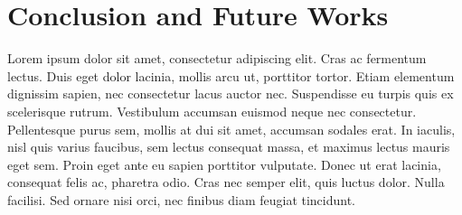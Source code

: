 \section{Conclusion and Future Works}
	Lorem ipsum dolor sit amet, consectetur adipiscing elit. Cras ac fermentum lectus. Duis eget dolor lacinia, mollis arcu ut, porttitor tortor. Etiam elementum dignissim sapien, nec consectetur lacus auctor nec. Suspendisse eu turpis quis ex scelerisque rutrum. Vestibulum accumsan euismod neque nec consectetur. Pellentesque purus sem, mollis at dui sit amet, accumsan sodales erat. In iaculis, nisl quis varius faucibus, sem lectus consequat massa, et maximus lectus mauris eget sem. Proin eget ante eu sapien porttitor vulputate. Donec ut erat lacinia, consequat felis ac, pharetra odio. Cras nec semper elit, quis luctus dolor. Nulla facilisi. Sed ornare nisi orci, nec finibus diam feugiat tincidunt.